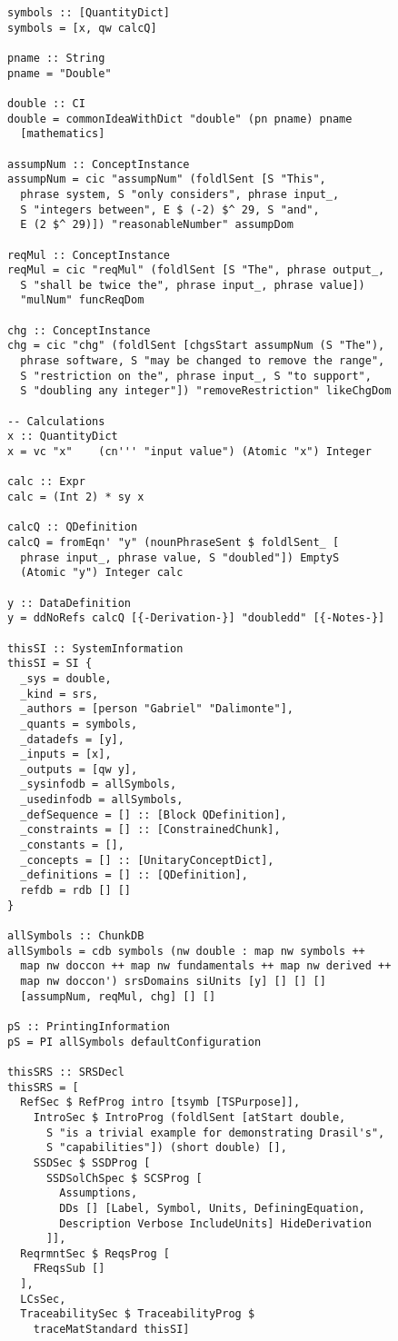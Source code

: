 \begin{tcolorbox}[breakable, toprule at break=0pt, bottomrule at break=0pt]
\begin{verbatim}
symbols :: [QuantityDict]
symbols = [x, qw calcQ]

pname :: String
pname = "Double"

double :: CI
double = commonIdeaWithDict "double" (pn pname) pname
  [mathematics]

assumpNum :: ConceptInstance
assumpNum = cic "assumpNum" (foldlSent [S "This",
  phrase system, S "only considers", phrase input_,
  S "integers between", E $ (-2) $^ 29, S "and",
  E (2 $^ 29)]) "reasonableNumber" assumpDom

reqMul :: ConceptInstance
reqMul = cic "reqMul" (foldlSent [S "The", phrase output_,
  S "shall be twice the", phrase input_, phrase value])
  "mulNum" funcReqDom

chg :: ConceptInstance
chg = cic "chg" (foldlSent [chgsStart assumpNum (S "The"),
  phrase software, S "may be changed to remove the range",
  S "restriction on the", phrase input_, S "to support",
  S "doubling any integer"]) "removeRestriction" likeChgDom

-- Calculations
x :: QuantityDict
x = vc "x"    (cn''' "input value") (Atomic "x") Integer

calc :: Expr
calc = (Int 2) * sy x

calcQ :: QDefinition
calcQ = fromEqn' "y" (nounPhraseSent $ foldlSent_ [
  phrase input_, phrase value, S "doubled"]) EmptyS
  (Atomic "y") Integer calc

y :: DataDefinition
y = ddNoRefs calcQ [{-Derivation-}] "doubledd" [{-Notes-}]

thisSI :: SystemInformation
thisSI = SI {
  _sys = double,
  _kind = srs,
  _authors = [person "Gabriel" "Dalimonte"],
  _quants = symbols,
  _datadefs = [y],
  _inputs = [x],
  _outputs = [qw y],
  _sysinfodb = allSymbols,
  _usedinfodb = allSymbols,
  _defSequence = [] :: [Block QDefinition],
  _constraints = [] :: [ConstrainedChunk],
  _constants = [],
  _concepts = [] :: [UnitaryConceptDict],
  _definitions = [] :: [QDefinition],
  refdb = rdb [] []
}

allSymbols :: ChunkDB
allSymbols = cdb symbols (nw double : map nw symbols ++
  map nw doccon ++ map nw fundamentals ++ map nw derived ++
  map nw doccon') srsDomains siUnits [y] [] [] []
  [assumpNum, reqMul, chg] [] []

pS :: PrintingInformation
pS = PI allSymbols defaultConfiguration

thisSRS :: SRSDecl
thisSRS = [
  RefSec $ RefProg intro [tsymb [TSPurpose]],
    IntroSec $ IntroProg (foldlSent [atStart double,
      S "is a trivial example for demonstrating Drasil's",
      S "capabilities"]) (short double) [],
    SSDSec $ SSDProg [
      SSDSolChSpec $ SCSProg [
        Assumptions,
        DDs [] [Label, Symbol, Units, DefiningEquation,
        Description Verbose IncludeUnits] HideDerivation
      ]],
  ReqrmntSec $ ReqsProg [
    FReqsSub []
  ],
  LCsSec,
  TraceabilitySec $ TraceabilityProg $
    traceMatStandard thisSI]


\end{verbatim}
\end{tcolorbox}
